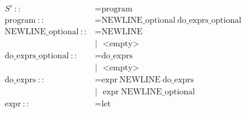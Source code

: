 \documentclass[a4paper,12pt]{book} %
\begin{document}
\allowdisplaybreaks
\begin{align*}
  S'\ ::                              & = \text{program}                                                                                                                                                                                                          \\
  \text{program}\ ::                  & = \text{NEWLINE\_optional}\ \text{do\_exprs\_optional}                                                                                                                                                                    \\
  \text{NEWLINE\_optional}\ ::        & = \text{NEWLINE}                                                                                                                                                                                                          \\
                                      & |\ \ \ \text{<empty>}                                                                                                                                                                                                     \\
  \text{do\_exprs\_optional}\ ::      & = \text{do\_exprs}                                                                                                                                                                                                        \\
                                      & |\ \ \ \text{<empty>}                                                                                                                                                                                                     \\
  \text{do\_exprs}\ ::                & = \text{expr}\ \text{NEWLINE}\ \text{do\_exprs}                                                                                                                                                                           \\
                                      & |\ \ \ \text{expr}\ \text{NEWLINE\_optional}                                                                                                                                                                              \\
  \text{expr}\ ::                     & = \text{let}                                                                                                                                                                                                              \\

\end{align*}
\end{document}
